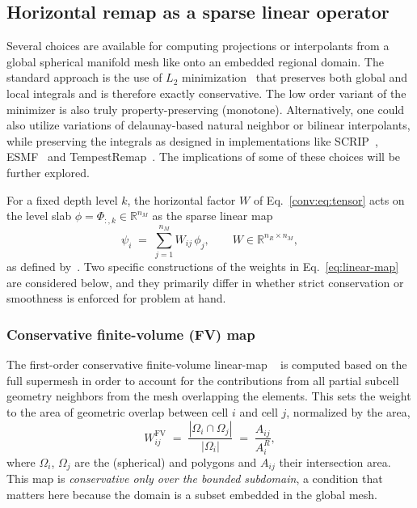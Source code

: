 \subsection{Horizontal remap as a sparse linear operator}\label{sec:horizontal}

Several choices are available for computing projections or interpolants from a global spherical manifold mesh like \MPAS onto an embedded \ROMS regional domain. The standard approach is the use of $L_2$ minimization~\citep{dukowicz1987accurate} that preserves both global and local integrals and is therefore exactly conservative. The low order variant of the minimizer is also truly property-preserving (monotone). %
Alternatively, one could also utilize variations of delaunay-based natural neighbor or bilinear interpolants, while preserving the integrals as designed in implementations like SCRIP~\citep{jones1999scrip}, ESMF~\citep{hill2004esmf} and TempestRemap~\citep{ullrich2015arbitrary}. The implications of some of these choices will be further explored.

For a fixed \MPAS depth level $k$, the horizontal factor $W$ of
Eq.~\eqref{conv:eq:tensor} acts on the level slab
$\phi=\Phi_{:,k} \in \mathbb{R}^{n_M}$ as the sparse linear map
\begin{equation}
	\psi_i \;=\; \sum_{j=1}^{n_M} W_{ij}\, \phi_j ,
	\qquad W \in \mathbb{R}^{n_R \times n_M},
	\label{eq:linear-map}
\end{equation}
as defined by~\citet{ullrich2015arbitrary}. Two
specific constructions of the weights in Eq.~\eqref{eq:linear-map} are
considered below, and they primarily differ in whether strict conservation or
smoothness is enforced for problem at hand.

\subsubsection{Conservative finite-volume (FV) map}
The first-order conservative finite-volume linear-map ~\citep{jones1999scrip} is computed based on the full supermesh in order to account for the contributions from all partial subcell geometry neighbors from the \MPAS mesh overlapping the \ROMS elements. This sets the
weight to the area of geometric overlap between \ROMS cell $i$ and
\MPAS cell $j$, normalized by the \ROMS area,
\begin{equation}
	W^{\mathrm{FV}}_{ij} \;=\; \frac{|\Omega_i \cap \Omega_j|}{|\Omega_i|}
	\;=\; \frac{A_{ij}}{A^R_i},
	\label{eq:fv-weight}
\end{equation}
where $\Omega_i$, $\Omega_j$ are the (spherical) \ROMS and \MPAS
polygons and $A_{ij}$ their intersection area. This map is
\emph{conservative only over the \ROMS bounded subdomain}, a
condition that matters here because the \ROMS{} domain is a subset embedded in the global \MPAS{} mesh. 


